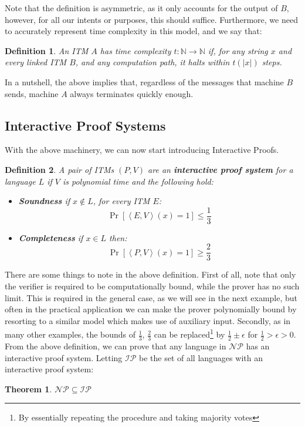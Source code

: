 \documentclass{article}
\newtheorem{theorem}{Theorem}
\newtheorem{definition}{Definition}
\begin{document}
Note that the definition is asymmetric, as it only accounts for the output of $B$, however, for all our intents or purposes, this should suffice. 
Furthermore, we need to accurately represent time complexity in this model, and we say that:

\begin{definition}
An ITM $A$ has time complexity $t: \mathbb{N} \to \mathbb{N}$ if, for any string $x$ and every linked ITM $B$, and any computation path, it halts within $t(|x|)$ steps. 
\end{definition}

In a nutshell, the above implies that, regardless of the messages that machine $B$ sends, machine $A$ always terminates quickly enough. 

\subsection{Interactive Proof Systems}
With the above machinery, we can now start introducing Interactive Proofs. 
\begin{definition}
A pair of ITMs $(P, V)$ are an \textbf{interactive proof system} for a language $L$ if $V$ is polynomial time and the following hold:
\begin{itemize}
    \item \textbf{Soundness} if $x \notin L$, for every ITM $E$:
        \[ \Pr[\left<E,V \right>(x) = 1] \leq \frac{1}{3} \]
    \item \textbf{Completeness} if $x \in L$ then:
        \[ \Pr[\left<P, V\right>(x) = 1 ] \geq \frac{2}{3}\]
\end{itemize}
\end{definition}
There are some things to note in the above definition. First of all, note that only the verifier is required to be computationally bound, while the prover has no such limit. This is required in the general case, as we will see in the next example, but often in the practical application we can make the prover polynomially bound by resorting to a similar model which makes use of auxiliary input. Secondly, as in many other examples, the bounds of $\frac{1}{3}$, $\frac{2}{3}$ can be replaced\footnote{By essentially repeating the procedure and taking majority votes} by $\frac{1}{2} \pm \epsilon$ for $\frac{1}{2} > \epsilon > 0$. From the above definition, we can prove that any language in $\mathcal{NP}$ has an interactive proof system. Letting $\mathcal{IP}$ be the set of all languages with an interactive proof system:
\begin{theorem}
$\mathcal{NP} \subseteq \mathcal{IP}$ \\
\end{theorem}
\end{document}
